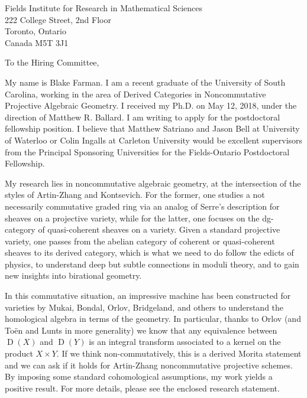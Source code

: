 \documentclass[10pt]{letter}
\date{\today}
\def\position{postdoctoral fellowship position}
\def\contacts{Manuel Reyes}
\begin{document}
\begin{letter}{
    Fields Institute for Research in Mathematical Sciences\\
    222 College Street, 2nd Floor\\
    Toronto, Ontario\\
    Canada M5T 3J1
}
  \opening{To the Hiring Committee,}
  
  My name is Blake Farman.
  I am a recent graduate of the University of South Carolina, working in the area of Derived Categories in Noncommutative Projective Algebraic Geometry.
  I received my Ph.D. on May 12, 2018, under the direction of Matthew R. Ballard.
  I am writing to apply for the \position.
  I believe that Matthew Satriano and Jason Bell at University of Waterloo or Colin Ingalls at Carleton University would be excellent supervisors from the Principal Sponsoring Universities for the Fields-Ontario Postdoctoral Fellowship.

  My research lies in noncommutative algebraic geometry, at the intersection of the styles of Artin-Zhang and Kontsevich.
  For the former, one studies a not necessarily commutative graded ring via an analog of Serre's description for sheaves on a projective variety, while for the latter, one focuses on the dg-category of quasi-coherent sheaves on a variety.
  Given a standard projective variety, one passes from the abelian category of coherent or quasi-coherent sheaves to its derived category, which is what we need to do follow the edicts of physics, to understand deep but subtle connections in moduli theory, and to gain new insights into birational geometry.

  In this commutative situation, an impressive machine has been constructed for varieties by Mukai, Bondal, Orlov, Bridgeland, and others to understand the homological algebra in terms of the geometry.
  In particular, thanks to Orlov (and To\"{e}n and Lunts in more generality) we know that any equivalence between \(\operatorname{D}(X)\) and \(\operatorname{D}(Y)\) is an integral transform associated to a kernel on the product \(X \times Y\).
  If we think non-commutatively, this is a derived Morita statement and we can ask if it holds for Artin-Zhang noncommutative projective schemes.
  By imposing some standard cohomological assumptions, my work yields a positive result.
  For more details, please see the enclosed research statement. 



\end{letter}
\end{document}
